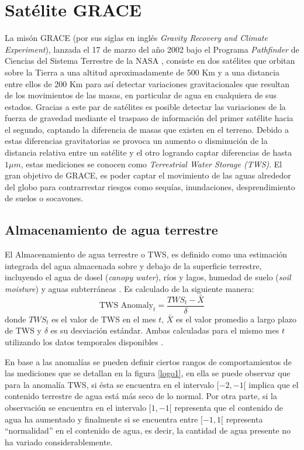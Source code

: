 \section{Satélite GRACE}
La misón GRACE (por sus siglas en inglés \textit{Gravity Recovery and Climate Experiment}), lanzada el 17 de marzo del año 2002
bajo el Programa \textit{Pathfinder} de Ciencias del Sistema Terrestre de la NASA \cite{11}, consiste en dos satélites 
que orbitan sobre la Tierra a una altitud aproximadamente de 500 Km y a una distancia entre ellos de 200 Km \cite{tws} para así detectar variaciones gravitacionales que resultan
de los movimientos de las masas, en particular de agua en cualquiera de sus estados.
Gracias a este par de satélites es posible detectar las variaciones de la fuerza de gravedad 
mediante el traspaso de información del primer satélite hacia el segundo, captando la diferencia de 
masas que existen en el terreno. Debido a estas diferencias gravitatorias se provoca un aumento o 
disminución de la distancia relativa entre un satélite y el otro logrando captar diferencias de hasta 
$1\mu m$, estas mediciones se conocen como \textit{Terrestrial Water Storage (TWS)}.
El gran objetivo de GRACE, es poder captar el movimiento de las aguas alrededor del globo para 
contrarrestar riesgos como sequías, inundaciones, desprendimiento de suelos o socavones.

\subsection{Almacenamiento de agua terrestre}
El Almacenamiento de agua terrestre o TWS, es definido como una estimación integrada del agua almacenada sobre y debajo de la superficie terrestre, 
incluyendo el agua de dosel (\textit{canopy water}), ríos y lagos, humedad de suelo (\textit{soil moisture}) y aguas subterráneas \cite{tws}. Es calculado de la siguiente manera:
\begin{equation}
    \text{TWS Anomaly}_t = \frac{TWS_t-\bar{X}}{\delta}
\end{equation}
donde $TWS_t$ es el valor de TWS en el mes $t$, $\bar{X}$ es el valor promedio a largo plazo de TWS y $\delta$ es su desviación estándar. Ambas calculadas para el mismo mes $t$ utilizando 
los datos temporales disponibles \cite{tws}.

En base a las anomalías se pueden definir ciertos rangos de comportamientos de las mediciones que se detallan en la figura \ref{logo1}, en ella se puede observar que para la anomalía TWS, si ésta se encuentra en el intervalo $[-2,-1[$
implica que  el contenido terrestre de agua está más seco de lo normal. Por otra parte, si la observación se encuentra en el intervalo $[1,-1[$ representa que el contenido de agua ha aumentado y finalmente si se encuentra entre
$[-1,1[$ representa ``normalidad'' en el contenido de agua, es decir, la cantidad de agua presente no ha variado considerablemente.


